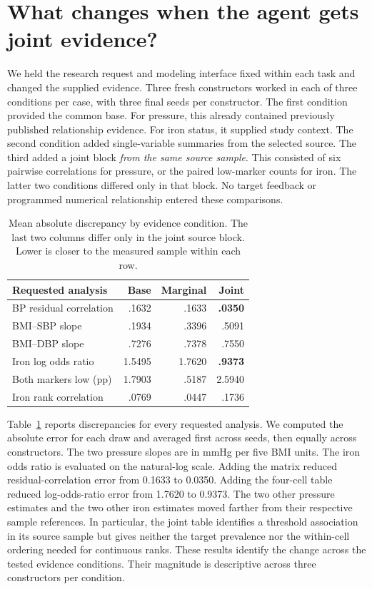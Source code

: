 \documentclass[sigconf,anonymous,review]{acmart}
\begin{document}
\section{What changes when the agent gets joint evidence?}
\label{sec:controlled}
We held the research request and modeling interface fixed within each task and changed the supplied evidence. Three fresh constructors worked in each of three conditions per case, with three final seeds per constructor. The first condition provided the common base. For pressure, this already contained previously published relationship evidence. For iron status, it supplied study context. The second condition added single-variable summaries from the selected source. The third added a joint block \emph{from the same source sample}. This consisted of six pairwise correlations for pressure, or the paired low-marker counts for iron. The latter two conditions differed only in that block. No target feedback or programmed numerical relationship entered these comparisons.

\begin{table}[t]
\caption{Mean absolute discrepancy by evidence condition. The last two columns differ only in the joint source block. Lower is closer to the measured sample within each row.}
\label{tab:evidence}
\centering
\begin{tabular}{@{}lrrr@{}}
\toprule
Requested analysis & Base & Marginal & Joint\\
\midrule
BP residual correlation & .1632 & .1633 & \textbf{.0350}\\
BMI--SBP slope & .1934 & .3396 & .5091\\
BMI--DBP slope & .7276 & .7378 & .7550\\
Iron log odds ratio & 1.5495 & 1.7620 & \textbf{.9373}\\
Both markers low (pp) & 1.7903 & .5187 & 2.5940\\
Iron rank correlation & .0769 & .0447 & .1736\\
\bottomrule
\end{tabular}
\end{table}

Table~\ref{tab:evidence} reports discrepancies for every requested analysis. We computed the absolute error for each draw and averaged first across seeds, then equally across constructors. The two pressure slopes are in mmHg per five BMI units. The iron odds ratio is evaluated on the natural-log scale. Adding the matrix reduced residual-correlation error from 0.1633 to 0.0350. Adding the four-cell table reduced log-odds-ratio error from 1.7620 to 0.9373. The two other pressure estimates and the two other iron estimates moved farther from their respective sample references. In particular, the joint table identifies a threshold association in its source sample but gives neither the target prevalence nor the within-cell ordering needed for continuous ranks. These results identify the change across the tested evidence conditions. Their magnitude is descriptive across three constructors per condition.
\end{document}
